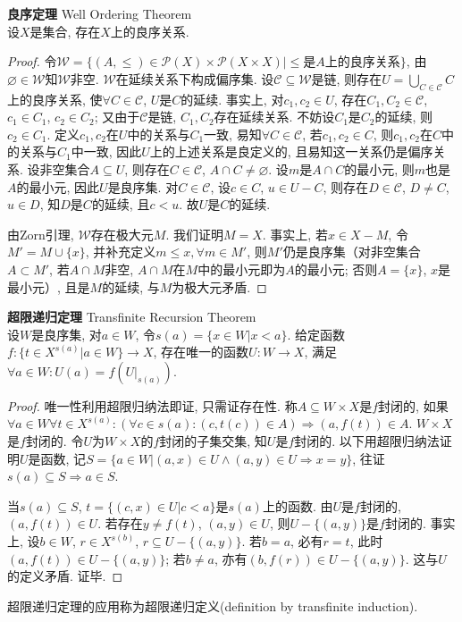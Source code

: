 \begin{thm} \textbf{良序定理} Well Ordering Theorem\\
设$X$是集合, 存在$X$上的良序关系. 
\end{thm}
\begin{proof}
令$\mathcal{W}=\{(A,\le)\in \mathcal{P}(X)\times \mathcal{P}(X\times X)\vert \le\text{是}A\text{上的良序关系}\}$, 由$\varnothing\in \mathcal{W}$知$\mathcal{W}$非空. $\mathcal{W}$在延续关系下构成偏序集. 设$\mathcal{C}\subseteq \mathcal{W}$是链, 则存在$U=\bigcup_{C\in \mathcal{C}} C$上的良序关系, 使$\forall C\in \mathcal{C}$, $U$是$C$的延续. 事实上, 对$c_1,c_2\in U$, 存在$C_1,C_2\in \mathcal{C}$, $c_1\in C_1$, $c_2\in C_2$; 又由于$\mathcal{C}$是链, $C_1,C_2$存在延续关系. 不妨设$C_1$是$C_2$的延续, 则$c_2\in C_1$. 定义$c_1,c_2$在$U$中的关系与$C_1$一致, 易知$\forall C\in \mathcal{C}$, 若$c_1,c_2\in C$, 则$c_1,c_2$在$C$中的关系与$C_1$中一致, 因此$U$上的上述关系是良定义的, 且易知这一关系仍是偏序关系. 设非空集合$A\subseteq U$, 则存在$C\in \mathcal{C}$, $A\cap C\neq \varnothing$. 设$m$是$A\cap C$的最小元, 则$m$也是$A$的最小元, 因此$U$是良序集. 对$C\in \mathcal{C}$, 设$c\in C$, $u\in U-C$, 则存在$D\in \mathcal{C}$, $D\neq C$, $u\in D$, 知$D$是$C$的延续, 且$c<u$. 故$U$是$C$的延续.
\par 由Zorn引理, $\mathcal{W}$存在极大元$M$. 我们证明$M=X$. 事实上, 若$x\in X-M$, 令$M'=M\cup \{x\}$, 并补充定义$m\le x, \forall m\in M'$, 则$M'$仍是良序集（对非空集合$A\subset M'$, 若$A\cap M$非空, $A\cap M$在$M$中的最小元即为$A$的最小元; 否则$A=\{x\}$, $x$是最小元）, 且是$M$的延续, 与$M$为极大元矛盾. 
\end{proof}

\begin{thm} \textbf{超限递归定理} Transfinite Recursion Theorem\\
设$W$是良序集, 对$a\in W$, 令$s(a)=\{x\in W\vert x<a\}$. 给定函数$f:\{t\in X^{s(a)}\vert a\in W\}\to X$, 存在唯一的函数$U:W\to X$, 满足$\forall a\in W: U(a)=f(U|_{s(a)})$.
\end{thm}
\begin{proof}
唯一性利用超限归纳法即证, 只需证存在性. 称$A\subseteq W\times X$是$f$封闭的, 如果$\forall a\in W \forall t\in X^{s(a)}: (\forall c\in s(a): (c,t(c))\in A )\Rightarrow (a,f(t))\in A$. $W\times X$是$f$封闭的. 令$U$为$W\times X$的$f$封闭的子集交集, 知$U$是$f$封闭的. 以下用超限归纳法证明$U$是函数, 记$S=\{a\in W\vert (a,x)\in U\land (a,y)\in U\Rightarrow x=y\}$, 往证$s(a)\subseteq  S\Rightarrow a\in S$. 
\par 当$s(a)\subseteq S$, $t=\{(c,x)\in U\vert c<a\}$是$s(a)$上的函数. 由$U$是$f$封闭的, $(a,f(t))\in U$. 若存在$y\neq f(t)$, $(a,y)\in U$, 则$U-\{(a,y)\}$是$f$封闭的. 事实上, 设$b\in W$, $r\in X^{s(b)}$, $r\subseteq U-\{(a,y)\}$. 若$b=a$, 必有$r=t$, 此时$(a,f(t))\in U-\{(a,y)\}$; 若$b\neq a$, 亦有$(b,f(r))\in U-\{(a,y)\}$. 这与$U$的定义矛盾. 证毕. 
\end{proof}
\par 超限递归定理的应用称为超限递归定义(definition by transfinite induction).  

